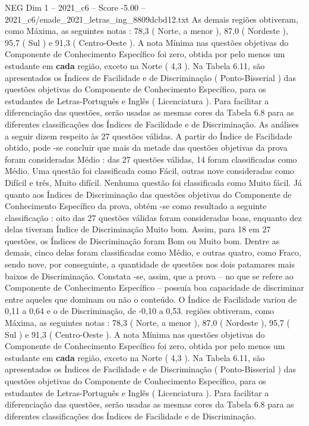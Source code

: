 \begin{textsample}{NEG Dim 1 – 2021\_c6 – Score -5.00 – 2021\_c6/enade\_2021\_letras\_ing\_8809dcbd12.txt}
As demais regiões obtiveram, como Máxima, as seguintes notas : 78,3 ( Norte, a menor ), 87,0 ( Nordeste ), 95,7 ( Sul ) e 91,3 ( Centro-Oeste ).
A nota Mínima nas questões objetivas do Componente de Conhecimento Específico foi zero, obtida por pelo menos um estudante em \textbf{cada} região, exceto na Norte ( 4,3 ).
Na Tabela 6.11, são apresentados os Índices de Facilidade e de Discriminação ( Ponto-Bisserial ) das questões objetivas do Componente de Conhecimento Específico, para os estudantes de Letras-Português e Inglês ( Licenciatura ).
Para facilitar a diferenciação das questões, serão usadas as mesmas cores da Tabela 6.8 para as diferentes classificações dos Índices de Facilidade e de Discriminação.
As análises a seguir dizem respeito às 27 questões válidas.
A partir do Índice de Facilidade obtido, pode -se concluir que mais da metade das questões objetivas da prova foram consideradas Médio : das 27 questões válidas, 14 foram classificadas como Médio.
Uma questão foi classificada como Fácil, outras nove consideradas como Difícil e três, Muito difícil.
Nenhuma questão foi classificada como Muito fácil.
Já quanto aos Índices de Discriminação das questões objetivas do Componente de Conhecimento Específico da prova, obtém -se como resultado a seguinte classificação : oito das 27 questões válidas foram consideradas boas, enquanto dez delas tiveram Índice de Discriminação Muito bom.
Assim, para 18 em 27 questões, os Índices de Discriminação foram Bom ou Muito bom.
Dentre as demais, cinco delas foram classificadas como Médio, e outras quatro, como Fraco, sendo nove, por conseguinte, a quantidade de questões nos dois patamares mais baixos de Discriminação.
Constata -se, assim, que a prova – no que se refere ao Componente de Conhecimento Específico – possuía boa capacidade de discriminar entre aqueles que dominam ou não o conteúdo.
O Índice de Facilidade variou de 0,11 a 0,64 e o de Discriminação, de -0,10 a 0,53. regiões obtiveram, como Máxima, as seguintes notas : 78,3 ( Norte, a menor ), 87,0 ( Nordeste ), 95,7 ( Sul ) e 91,3 ( Centro-Oeste ).
A nota Mínima nas questões objetivas do Componente de Conhecimento Específico foi zero, obtida por pelo menos um estudante em \textbf{cada} região, exceto na Norte ( 4,3 ).
Na Tabela 6.11, são apresentados os Índices de Facilidade e de Discriminação ( Ponto-Bisserial ) das questões objetivas do Componente de Conhecimento Específico, para os estudantes de Letras-Português e Inglês ( Licenciatura ).
Para facilitar a diferenciação das questões, serão usadas as mesmas cores da Tabela 6.8 para as diferentes classificações dos Índices de Facilidade e de Discriminação.

\end{textsample}
